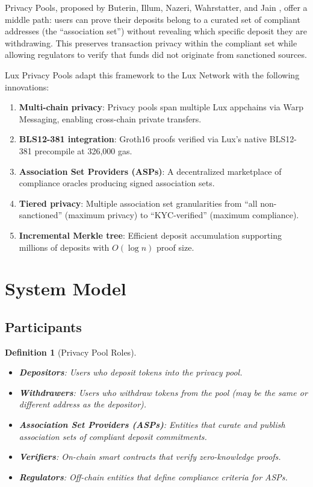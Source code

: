 \documentclass[11pt,a4paper]{article}
\newtheorem{definition}{Definition}
\begin{document}
Privacy Pools, proposed by Buterin, Illum, Nazeri, Wahrstatter, and Jain \cite{buterin2023privacy}, offer a middle path: users can prove their deposits belong to a curated set of compliant addresses (the ``association set'') without revealing which specific deposit they are withdrawing. This preserves transaction privacy within the compliant set while allowing regulators to verify that funds did not originate from sanctioned sources.

Lux Privacy Pools adapt this framework to the Lux Network with the following innovations:

\begin{enumerate}[label=(\roman*)]
    \item \textbf{Multi-chain privacy}: Privacy pools span multiple Lux appchains via Warp Messaging, enabling cross-chain private transfers.
    \item \textbf{BLS12-381 integration}: Groth16 proofs verified via Lux's native BLS12-381 precompile at 326,000 gas.
    \item \textbf{Association Set Providers (ASPs)}: A decentralized marketplace of compliance oracles producing signed association sets.
    \item \textbf{Tiered privacy}: Multiple association set granularities from ``all non-sanctioned'' (maximum privacy) to ``KYC-verified'' (maximum compliance).
    \item \textbf{Incremental Merkle tree}: Efficient deposit accumulation supporting millions of deposits with $O(\log n)$ proof size.
\end{enumerate}

\section{System Model}\label{sec:model}

\subsection{Participants}

\begin{definition}[Privacy Pool Roles]
\begin{itemize}
    \item \textbf{Depositors}: Users who deposit tokens into the privacy pool.
    \item \textbf{Withdrawers}: Users who withdraw tokens from the pool (may be the same or different address as the depositor).
    \item \textbf{Association Set Providers (ASPs)}: Entities that curate and publish association sets of compliant deposit commitments.
    \item \textbf{Verifiers}: On-chain smart contracts that verify zero-knowledge proofs.
    \item \textbf{Regulators}: Off-chain entities that define compliance criteria for ASPs.
\end{itemize}
\end{definition}
\end{document}
